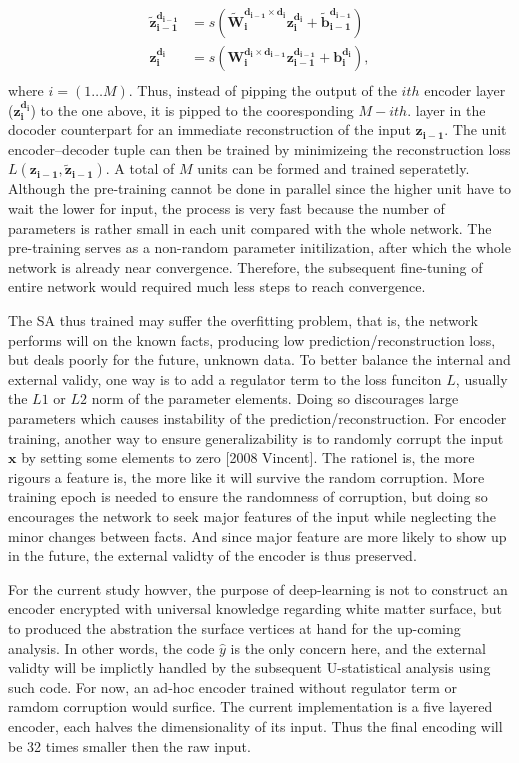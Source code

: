 \begin{equation} \label{eq:unit encoder-decoder}
\begin{split}
  \boldsymbol{\tilde{z}_{i-1}^{d_{i-1}}} &= s(\boldsymbol{\tilde{W}_{i  }^{d_{i-1} \times d_{i  }} z_{i  }^{d_{i  }}}+\boldsymbol{\tilde{b}_{i-1}^{d_{i-1}}}) \\
  \boldsymbol{z_{i  }^{d_{i  }}}         &= s(\boldsymbol{W_{i  }^{d_{i  } \times d_{i-1}} z_{i-1}^{d_{i-1}}}+\boldsymbol{b_{i  }^{d_{i  }}}), \\
\end{split}
\end{equation}
where $i=(1 \ldots M)$. Thus, instead of pipping the output of the $i th$ encoder layer ($\boldsymbol{z_{i  }^{d_{i  }}}$) to the one above, it is pipped to the cooresponding $M-i th.$ layer in the docoder counterpart for an immediate reconstruction of the input $\boldsymbol{z_{i-1}}$. The unit encoder--decoder tuple can then be trained by minimizeing the reconstruction loss $L(\boldsymbol{z_{i-1}},\boldsymbol{\tilde{z}_{i-1}})$. A total of $M$ units can be formed and trained seperatetly. Although the pre-training cannot be done in parallel since the higher unit have to wait the lower for input, the process is very fast because the number of parameters is rather small in each unit compared with the whole network. The pre-training serves as a non-random parameter initilization, after which the whole network is already near convergence. Therefore, the subsequent fine-tuning of entire network would required much less steps to reach convergence.

The SA thus trained may suffer the overfitting problem, that is, the network performs will on the known facts, producing low prediction/reconstruction loss, but deals poorly for the future, unknown data. To better balance the internal and external validy, one way is to add a regulator term to the loss funciton $L$, usually the $L1$ or $L2$ norm of the parameter elements. Doing so discourages large parameters which causes instability of the prediction/reconstruction. For encoder training, another way to ensure generalizability is to randomly corrupt the input $\boldsymbol{x}$ by setting some elements to zero [2008 Vincent]. The rationel is, the more rigours a feature is, the more like it will survive the random corruption. More training epoch is needed to ensure the randomness of corruption, but doing so encourages the network to seek major features of the input while neglecting the minor changes between facts. And since major feature are more likely to show up in the future, the external validty of the encoder is thus preserved.

For the current study howver, the purpose of deep-learning is not to construct an encoder encrypted with universal knowledge regarding white matter surface, but to produced the abstration the surface vertices at hand for the up-coming analysis. In other words, the code $\hat{y}$ is the only concern here, and the external validty will be implictly handled by the subsequent U-statistical analysis using such code. For now, an ad-hoc encoder trained without regulator term or ramdom corruption would surfice. The current implementation is a five layered encoder, each halves the dimensionality of its input. Thus the final encoding will be 32 times smaller then the raw input.

